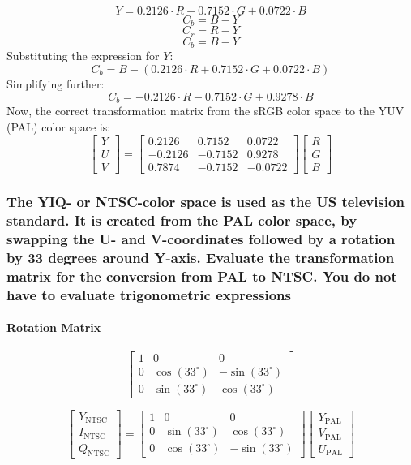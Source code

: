 \documentclass{article}
\begin{document}
\[ Y = 0.2126 \cdot R + 0.7152 \cdot G + 0.0722 \cdot B \]
\[ C_b = B - Y \]
\[ C_r = R - Y \]
\[ C_b = B - Y \]
Substituting the expression for \( Y \):
\[ C_b = B - (0.2126 \cdot R + 0.7152 \cdot G + 0.0722 \cdot B) \]
Simplifying further:
\[ C_b = -0.2126 \cdot R - 0.7152 \cdot G + 0.9278 \cdot B \]
Now, the correct transformation matrix from the sRGB color space to the YUV (PAL) color space is:
\[ \begin{bmatrix} Y \\ U \\ V \end{bmatrix} = \begin{bmatrix} 0.2126 & 0.7152 & 0.0722 \\ -0.2126 & -0.7152 & 0.9278 \\ 0.7874 & -0.7152 & -0.0722 \end{bmatrix} \begin{bmatrix} R \\ G \\ B \end{bmatrix} \]

\subsubsection*{The YIQ- or NTSC-color space is used as the US television standard. It is
created from the PAL color space, by swapping the U- and V-coordinates followed by a rotation by 33 degrees around Y-axis. Evaluate the transformation
matrix for the conversion from PAL to NTSC. You do not have to evaluate
trigonometric expressions}
\paragraph*{Rotation Matrix}
\[
\begin{bmatrix}
1 & 0 & 0 \\
0 & \cos(33^\circ) & -\sin(33^\circ) \\
0 & \sin(33^\circ) & \cos(33^\circ)
\end{bmatrix}
\]



\[ \begin{bmatrix} Y_{\text{NTSC}} \\ I_{\text{NTSC}} \\ Q_{\text{NTSC}} \end{bmatrix} = \begin{bmatrix} 1 & 0 & 0 \\ 0 & \sin(33^\circ) & \cos(33^\circ) \\ 0 & \cos(33^\circ) & -\sin(33^\circ) \end{bmatrix} \begin{bmatrix} Y_{\text{PAL}} \\ V_{\text{PAL}} \\ U_{\text{PAL}} \end{bmatrix} \]
\end{document}
